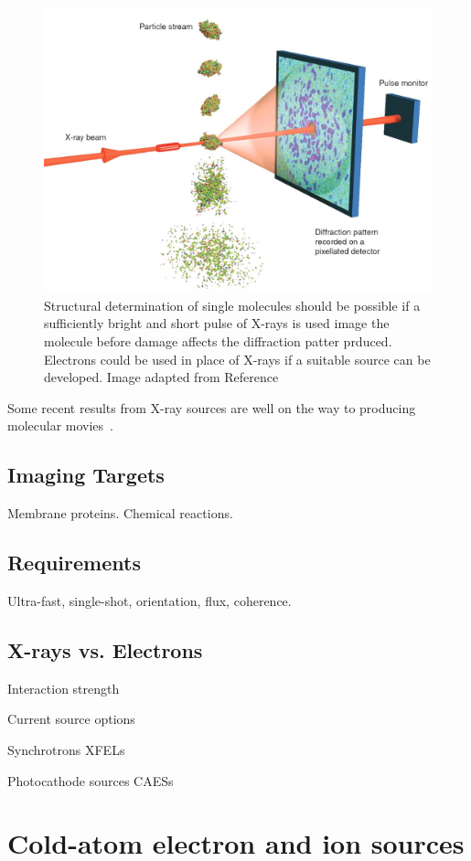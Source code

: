 \begin{figure}
    \center
    \includegraphics[width=0.65\linewidth]{0intro/Figs/single_molecule_cdi.jpg}
    \caption{Structural determination of single molecules should be possible if a sufficiently bright and short pulse of X-rays is used image the molecule before damage affects the diffraction patter prduced. Electrons could be used in place of X-rays if a suitable source can be developed. Image adapted from Reference~\cite{gaffney_imaging_2007}}
    \label{figure:molecule_cdi}
\end{figure}

Some recent results from X-ray sources are well on the way to producing molecular movies~\cite{pande_femtosecond_2016,nango_three-dimensional_2016}.

\subsection{Imaging Targets}

Membrane proteins.
Chemical reactions.


\subsection{Requirements}

Ultra-fast, single-shot, orientation, flux, coherence.

\subsection{X-rays vs. Electrons}

Interaction strength

Current source options

Synchrotrons
XFELs

Photocathode sources
CAESs

\section{Cold-atom electron and ion sources}

